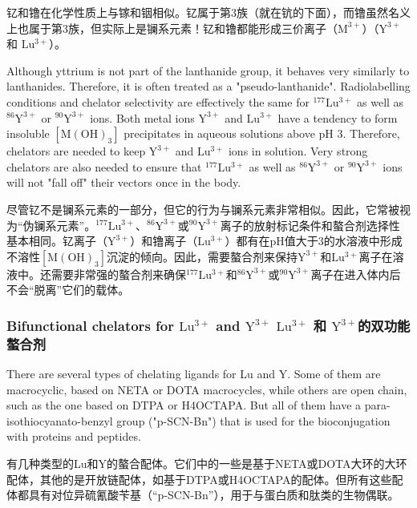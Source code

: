\documentclass[dvipsnames, svgnames,a4paper,11pt]{article}
\begin{document}
钇和镥在化学性质上与镓和铟相似。钇属于第3族（就在钪的下面），而镥虽然名义上也属于第3族，但实际上是镧系元素！钇和镥都能形成三价离子（\(\mathrm{M^{3+}}\)）（\(\mathrm{Y^{3+}}\) 和 \(\mathrm{Lu^{3+}}\)）。


Although yttrium is not part of the lanthanide group, it behaves very similarly to lanthanides. Therefore, it is often treated as a "pseudo-lanthanide". Radiolabelling conditions and chelator selectivity are effectively the same for \(\mathrm{^{177}Lu^{3+}}\) as well as \(\mathrm{^{86}Y^{3+}}\) or \(\mathrm{^{90}Y^{3+}}\) ions. Both metal ions \(\mathrm{Y^{3+}}\) and \(\mathrm{Lu^{3+}}\) have a tendency to form insoluble \([\mathrm{M(OH)_{3}}]\) precipitates in aqueous solutions above pH 3. Therefore, chelators are needed to keep \(\mathrm{Y^{3+}}\) and \(\mathrm{Lu^{3+}}\) ions in solution. Very strong chelators are also needed to ensure that \(\mathrm{^{177}Lu^{3+}}\) as well as \(\mathrm{^{86}Y^{3+}}\) or \(\mathrm{^{90}Y^{3+}}\) ions will not "fall off" their vectors once in the body.

尽管钇不是镧系元素的一部分，但它的行为与镧系元素非常相似。因此，它常被视为“伪镧系元素”。\(\mathrm{^{177}Lu^{3+}}\)、\(\mathrm{^{86}Y^{3+}}\)或\(\mathrm{^{90}Y^{3+}}\)离子的放射标记条件和螯合剂选择性基本相同。钇离子（\(\mathrm{Y^{3+}}\)）和镥离子（\(\mathrm{Lu^{3+}}\)）都有在pH值大于3的水溶液中形成不溶性\([\mathrm{M(OH)_{3}}]\)沉淀的倾向。因此，需要螯合剂来保持\(\mathrm{Y^{3+}}\)和\(\mathrm{Lu^{3+}}\)离子在溶液中。还需要非常强的螯合剂来确保\(\mathrm{^{177}Lu^{3+}}\)和\(\mathrm{^{86}Y^{3+}}\)或\(\mathrm{^{90}Y^{3+}}\)离子在进入体内后不会“脱离”它们的载体。

\subsubsection{Bifunctional chelators for \(\mathrm{Lu^{3+}}\) and \(\mathrm{Y^{3+}}\) \(\mathrm{Lu^{3+}}\) 和 \(\mathrm{Y^{3+}}\)的双功能螯合剂}  
There are several types of chelating ligands for Lu and Y. Some of them are macrocyclic, based on NETA or DOTA macrocycles, while others are open chain, such as the one based on DTPA or H4OCTAPA. But all of them have a para-isothiocyanato-benzyl group ("p-SCN-Bn") that is used for the bioconjugation with proteins and peptides.

有几种类型的Lu和Y的螯合配体。它们中的一些是基于NETA或DOTA大环的大环配体，其他的是开放链配体，如基于DTPA或H4OCTAPA的配体。但所有这些配体都具有对位异硫氰酸苄基（“p-SCN-Bn”），用于与蛋白质和肽类的生物偶联。
\end{document}

